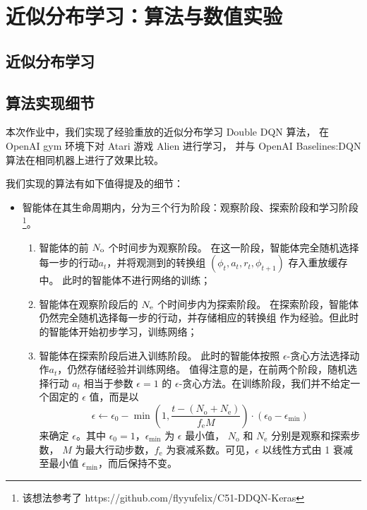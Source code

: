 \documentclass[UTF8]{ctexart}
\begin{document}
\section{近似分布学习：算法与数值实验}
\subsection{近似分布学习}
\subsection{算法实现细节}
本次作业中，我们实现了经验重放的近似分布学习 Double DQN 算法，
在 OpenAI gym 环境下对 Atari 游戏 Alien 进行学习，
并与 OpenAI Baselines:DQN 算法在相同机器上进行了效果比较。
\par
我们实现的算法有如下值得提及的细节：
\begin{itemize}
\item 智能体在其生命周期内，分为三个行为阶段：观察阶段、探索阶段和学习阶段
            \footnote{该想法参考了 https://github.com/flyyufelix/C51-DDQN-Keras}。
    \begin{enumerate}
        \item 智能体的前 $N_{\text o}$ 个时间步为观察阶段。
                在这一阶段，智能体完全随机选择每一步的行动$a_t$，并将观测到的转换组
                $(\phi_t,a_t,r_t,\phi_{t+1})$ 存入重放缓存中。
                此时的智能体不进行网络的训练；
        \item 智能体在观察阶段后的 $N_{\text e}$ 个时间步内为探索阶段。
                在探索阶段，智能体仍然完全随机选择每一步的行动，并存储相应的转换组
                作为经验。但此时的智能体开始初步学习，训练网络；
        \item 智能体在探索阶段后进入训练阶段。
                此时的智能体按照 $\epsilon$-贪心方法选择动作$a_t$，仍然存储经验并训练网络。
                值得注意的是，在前两个阶段，随机选择行动 $a_t$ 相当于参数 $\epsilon=1$ 的
                $\epsilon$-贪心方法。在训练阶段，我们并不给定一个固定的 $\epsilon$ 值，而是以
                \[
                    \epsilon \leftarrow \epsilon_0 - \min {\left(1, \frac{ t-(N_{\text{o}}+N_{\text{e}})}
                       {f_{\text{e}}M}\right) \cdot (\epsilon_0 - \epsilon_{\min})}
                \]
                来确定 $\epsilon$。其中 $\epsilon_0=1$，$\epsilon_{\min}$ 为 $\epsilon$ 最小值，
                $N_{\text{o}}$ 和 $N_{\text{e}}$ 分别是观察和探索步数，
                $M$ 为最大行动步数，$f_{\text{e}}$ 为衰减系数。可见，$\epsilon$ 以线性方式由
                1 衰减至最小值 $\epsilon_{\min}$，而后保持不变。 

\end{enumerate}
\end{itemize}
\end{document}

